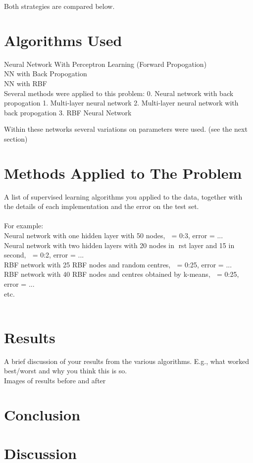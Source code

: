 \documentclass[11pt]{article}
\begin{document}
\begin{page}
Both strategies are compared below.

\section{Algorithms Used}
Neural Network With Perceptron Learning (Forward Propogation)\\
NN with Back Propogation\\
NN with RBF\\

Several methods were applied to this problem:
0. Neural network with back propogation
1. Multi-layer neural network
2. Multi-layer neural network with back propogation
3. RBF Neural Network

Within these networks several variations on parameters were used. (see the next section)

\section{Methods Applied to The Problem}
A list of supervised learning algorithms you applied to the data, together with the details
of each implementation and the error on the test set.\\\\
For example:\\
Neural network with one hidden layer with 50 nodes,  = 0:3, error = ...\\
Neural network with two hidden layers with 20 nodes in rst layer and 15 in second,  = 0:2,
error = ...\\
RBF network with 25 RBF nodes and random centres,  = 0:25, error = ...\\
RBF network with 40 RBF nodes and centres obtained by k-means,  = 0:25, error = ...\\
etc.\\

\\


\section{Results}
A brief discussion of your results from the various algorithms. E.g., what worked best/worst
and why you think this is so.\\

Images of results before and after\\

\section{Conclusion}


\section{Discussion}

\end{page}
\end{document}
